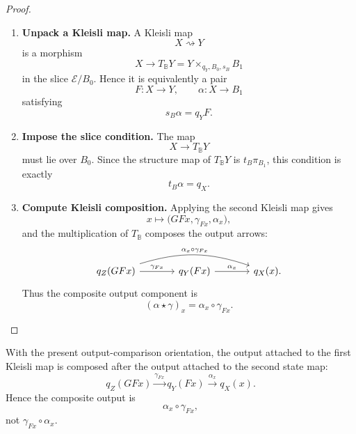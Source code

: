 \begin{proof}
    \leavevmode
    \begin{enumerate}
        \item \textbf{Unpack a Kleisli map.}
        A Kleisli map
        \[
            X\rightsquigarrow Y
        \]
        is a morphism
        \[
            X\to T_{\mathbb B}Y
            =
            Y\times_{q_Y,B_0,s_B}B_1
        \]
        in the slice \(\mathcal E/B_0\). Hence it is equivalently a pair
        \[
            F:X\to Y,
            \qquad
            \alpha:X\to B_1
        \]
        satisfying
        \[
            s_B\alpha=q_YF.
        \]

        \item \textbf{Impose the slice condition.}
        The map
        \[
            X\to T_{\mathbb B}Y
        \]
        must lie over \(B_0\). Since the structure map of \(T_{\mathbb B}Y\) is
        \(t_B\pi_{B_1}\), this condition is exactly
        \[
            t_B\alpha=q_X.
        \]

        \item \textbf{Compute Kleisli composition.}
        Applying the second Kleisli map gives
        \[
            x\longmapsto
            \bigl(GF x,\gamma_{Fx},\alpha_x\bigr),
        \]
        and the multiplication of \(T_{\mathbb B}\) composes the output arrows:
        \[
        \begin{tikzcd}[column sep=large, row sep=large]
            q_Z(GFx)
                \arrow[r, "{\gamma_{Fx}}"]
                \arrow[rr, bend left=18, "{\alpha_x\circ\gamma_{Fx}}"]
            &
            q_Y(Fx)
                \arrow[r, "{\alpha_x}"]
            &
            q_X(x).
        \end{tikzcd}
        \]
        Thus the composite output component is
        \[
            (\alpha\star\gamma)_x
            =
            \alpha_x\circ\gamma_{Fx}.
        \]
    \end{enumerate}
\end{proof}

\begin{remark}
\label{rem:syn-to-kleisli-composition-order}
    With the present output-comparison orientation, the output attached to the
    first Kleisli map is composed after the output attached to the second state
    map:
    \[
        q_Z(GFx)
            \xrightarrow{\gamma_{Fx}}
        q_Y(Fx)
            \xrightarrow{\alpha_x}
        q_X(x).
    \]
    Hence the composite output is
    \[
        \alpha_x\circ\gamma_{Fx},
    \]
    not \(\gamma_{Fx}\circ\alpha_x\).
\end{remark}

